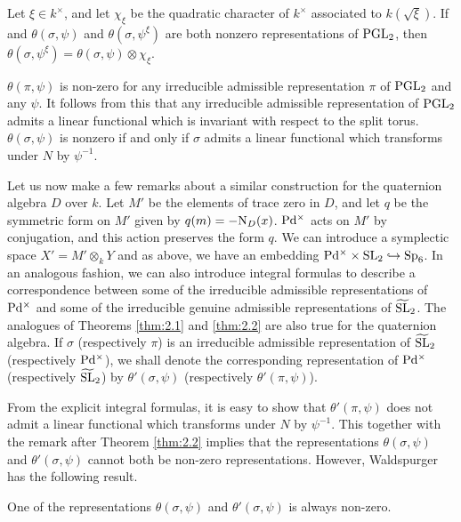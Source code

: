 \begin{theorem}
\label{thm:2.2}
Let $\xi \in k^\times$, and let $\chi_\xi$ be the quadratic character of $k^\times$ associated to $k(\sqrt{\xi})$.
If and $\theta(\sigma, \psi)$ and $\theta(\sigma, \psi^\xi)$ are both nonzero representations of $\mathrm{PGL}_2$, then $\theta(\sigma, \psi^\xi) = \theta(\sigma, \psi) \otimes \chi_\xi$.
\end{theorem}
\begin{remark*}
$\theta(\pi, \psi)$ is non-zero for any irreducible admissible representation $\pi$ of $\mathrm{PGL}_2$ and any $\psi$.
It follows from this that any irreducible admissible representation of $\mathrm{PGL}_2$ admits a linear functional which is invariant with respect to the split torus.
$\theta(\sigma, \psi)$ is nonzero if and only if $\sigma$ admits a linear functional which transforms under $N$ by $\psi^{-1}$.
\end{remark*}

Let us now make a few remarks about a similar construction for the quaternion algebra $D$ over $k$.
Let $M'$ be the elements of trace zero in $D$, and let $q$ be the symmetric form on $M'$ given by $q(m) = -\mathrm{N}_D(x)$.
$\mathrm{P} \mathrm{d}^\times$ acts on $M'$ by conjugation, and this action preserves the form $q$.
We can introduce a symplectic space $X' = M'\otimes_k Y$ and as above, we have an embedding $\mathrm{P} \mathrm{d}^\times \times \mathrm{SL}_2 \hookrightarrow \mathrm{Sp}_6$.
In an analogous fashion, we can also introduce integral formulas to describe a correspondence between some of the irreducible admissible representations of $\mathrm{P} \mathrm{d}^\times$ and some of the irreducible genuine admissible representations of $\widetilde{\mathrm{SL}}_2$.
The analogues of Theorems \ref{thm:2.1} and \ref{thm:2.2} are also true for the quaternion algebra.
If $\sigma$ (respectively $\pi$) is an irreducible admissible representation of $\widetilde{\mathrm{SL}}_2$ (respectively $\mathrm{P} \mathrm{d}^\times$), we shall denote the corresponding representation of $\mathrm{P} \mathrm{d}^\times$ (respectively $\widetilde{\mathrm{SL}}_2$) by $\theta'(\sigma, \psi)$ (respectively $\theta'(\pi,\psi)$).

From the explicit integral formulas, it is easy to show that
$\theta'(\pi, \psi)$ does not admit a linear functional which transforms under $N$ by $\psi^{-1}$.
This together with the remark after Theorem \ref{thm:2.2} implies that the representations $\theta(\sigma, \psi)$ and $\theta'(\sigma, \psi)$ cannot both be non-zero representations.
However, Waldspurger has the following result.
\begin{theorem}
\label{thm:2.3}
One of the representations $\theta(\sigma, \psi)$ and $\theta'(\sigma, \psi)$ is always non-zero.
\end{theorem}

